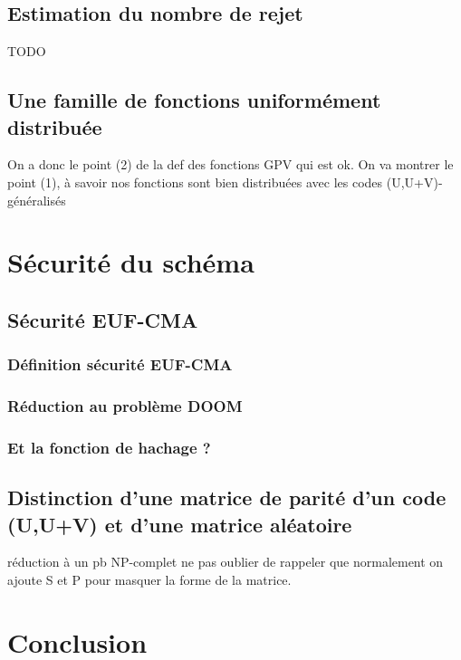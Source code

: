 \documentclass[12pt]{article}
\theoremstyle{definition}
\begin{document}
\subsection{Estimation du nombre de rejet}
TODO \\

\subsection{Une famille de fonctions uniformément distribuée}
On a donc le point (2) de la def des fonctions GPV qui est ok. On va montrer le point (1), à savoir nos fonctions sont bien distribuées avec les codes (U,U+V)-généralisés \\

\section{Sécurité du schéma}

\subsection{Sécurité EUF-CMA}
\subsubsection{Définition sécurité EUF-CMA}
\subsubsection{Réduction au problème DOOM}
\subsubsection{Et la fonction de hachage ?}

\subsection{Distinction d'une matrice de parité d'un code (U,U+V) et d'une matrice aléatoire}
réduction à un pb NP-complet
ne pas oublier de rappeler que normalement on ajoute S et P pour masquer la forme de la matrice.

\section*{Conclusion}

\newpage




\end{document}
